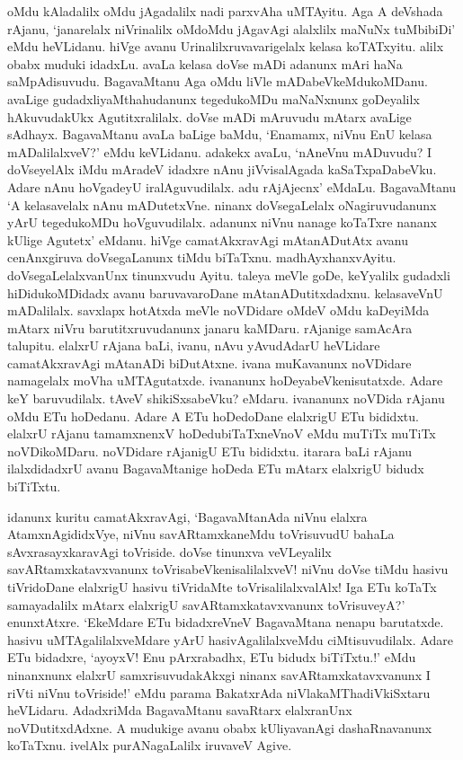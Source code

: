 oMdu kAladalilx oMdu jAgadalilx nadi parxvAha uMTAyitu. Aga A deVshada rAjanu, `janarelalx niVrinalilx oMdoMdu jAgavAgi alalxlilx maNuNx tuMbibiDi' eMdu heVLidanu. hiVge avanu Urinalilxruvavarigelalx kelasa koTATxyitu. alilx obabx muduki idadxLu. avaLa kelasa doVse mADi adanunx mAri haNa saMpAdisuvudu. BagavaMtanu Aga oMdu liVle mADabeVkeMdukoMDanu. avaLige gudadxliyaMthahudanunx tegedukoMDu maNaNxnunx goDeyalilx hAkuvudakUkx Agutitxralilalx. doVse mADi mAruvudu mAtarx avaLige sAdhayx. BagavaMtanu avaLa baLige baMdu, `Enamamx, niVnu EnU kelasa mADalilalxveV?' eMdu keVLidanu. adakekx avaLu, `nAneVnu mADuvudu? I doVseyelAlx iMdu mAradeV idadxre nAnu jiVvisalAgada kaSaTxpaDabeVku. Adare nAnu hoVgadeyU iralAguvudilalx. adu rAjAjecnx' eMdaLu. BagavaMtanu `A kelasavelalx nAnu mADutetxVne. ninanx doVsegaLelalx oNagiruvudanunx yArU tegedukoMDu hoVguvudilalx. adanunx niVnu nanage koTaTxre nananx kUlige Agutetx' eMdanu. hiVge camatAkxravAgi mAtanADutAtx avanu cenAnxgiruva doVsegaLanunx tiMdu biTaTxnu. madhAyxhanxvAyitu. doVsegaLelalxvanUnx tinunxvudu Ayitu. taleya meVle goDe, keYyalilx gudadxli hiDidukoMDidadx avanu baruvavaroDane mAtanADutitxdadxnu. kelasaveVnU mADalilalx. savxlapx hotAtxda meVle noVDidare oMdeV oMdu kaDeyiMda mAtarx niVru barutitxruvudanunx janaru kaMDaru. rAjanige samAcAra talupitu. elalxrU rAjana baLi, ivanu, nAvu yAvudAdarU heVLidare camatAkxravAgi mAtanADi biDutAtxne. ivana muKavanunx noVDidare namagelalx moVha uMTAgutatxde. ivananunx hoDeyabeVkenisutatxde. Adare keY baruvudilalx. tAveV shikiSxsabeVku? eMdaru. ivananunx noVDida rAjanu oMdu ETu hoDedanu. Adare A ETu hoDedoDane elalxrigU ETu bididxtu. elalxrU rAjanu tamamxnenxV hoDedubiTaTxneVnoV eMdu muTiTx muTiTx noVDikoMDaru. noVDidare rAjanigU ETu bididxtu. itarara baLi rAjanu ilalxdidadxrU avanu BagavaMtanige hoDeda ETu mAtarx elalxrigU bidudx biTiTxtu.

idanunx kuritu camatAkxravAgi, `BagavaMtanAda niVnu elalxra AtamxnAgididxVye, niVnu savARtamxkaneMdu toVrisuvudU bahaLa sAvxrasayxkaravAgi toVriside. doVse tinunxva veVLeyalilx savARtamxkatavxvanunx toVrisabeVkenisalilalxveV! niVnu doVse tiMdu hasivu tiVridoDane elalxrigU hasivu tiVridaMte toVrisalilalxvalAlx! Iga ETu koTaTx samayadalilx mAtarx elalxrigU savARtamxkatavxvanunx toVrisuveyA?' enunxtAtxre. `EkeMdare ETu bidadxreVneV BagavaMtana nenapu barutatxde. hasivu uMTAgalilalxveMdare yArU hasivAgalilalxveMdu ciMtisuvudilalx. Adare ETu bidadxre, `ayoyxV! Enu pArxrabadhx, ETu bidudx biTiTxtu.!' eMdu ninanxnunx elalxrU samxrisuvudakAkxgi ninanx savARtamxkatavxvanunx I riVti niVnu toVriside!' eMdu parama BakatxrAda niVlakaMThadiVkiSxtaru heVLidaru. AdadxriMda BagavaMtanu savaRtarx elalxranUnx noVDutitxdAdxne. A mudukige avanu obabx kUliyavanAgi dashaRnavanunx koTaTxnu. ivelAlx purANagaLalilx iruvaveV Agive.

